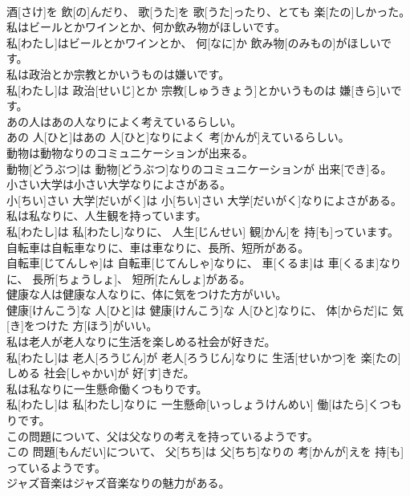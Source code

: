 \documentclass[8pt]{extreport}
\begin{document}
\begin{CJK}{UTF8}{min}
\\	酒[さけ]を 飲[の]んだり、 歌[うた]を 歌[うた]ったり、とても 楽[たの]しかった。
\\	私はビールとかワインとか、何か飲み物がほしいです。	
\\	私[わたし]はビールとかワインとか、 何[なに]か 飲み物[のみもの]がほしいです。
\\	私は政治とか宗教とかいうものは嫌いです。	
\\	私[わたし]は 政治[せいじ]とか 宗教[しゅうきょう]とかいうものは 嫌[きら]いです。
\\	あの人はあの人なりによく考えているらしい。	
\\	あの 人[ひと]はあの 人[ひと]なりによく 考[かんが]えているらしい。
\\	動物は動物なりのコミュニケーションが出来る。	
\\	動物[どうぶつ]は 動物[どうぶつ]なりのコミュニケーションが 出来[でき]る。
\\	小さい大学は小さい大学なりによさがある。	
\\	小[ちい]さい 大学[だいがく]は 小[ちい]さい 大学[だいがく]なりによさがある。
\\	私は私なりに、人生観を持っています。	
\\	私[わたし]は 私[わたし]なりに、 人生[じんせい] 観[かん]を 持[も]っています。
\\	自転車は自転車なりに、車は車なりに、長所、短所がある。	
\\	自転車[じてんしゃ]は 自転車[じてんしゃ]なりに、 車[くるま]は 車[くるま]なりに、 長所[ちょうしょ]、 短所[たんしょ]がある。
\\	健康な人は健康な人なりに、体に気をつけた方がいい。	
\\	健康[けんこう]な 人[ひと]は 健康[けんこう]な 人[ひと]なりに、 体[からだ]に 気[き]をつけた 方[ほう]がいい。
\\	私は老人が老人なりに生活を楽しめる社会が好きだ。	
\\	私[わたし]は 老人[ろうじん]が 老人[ろうじん]なりに 生活[せいかつ]を 楽[たの]しめる 社会[しゃかい]が 好[す]きだ。
\\	私は私なりに一生懸命働くつもりです。	
\\	私[わたし]は 私[わたし]なりに 一生懸命[いっしょうけんめい] 働[はたら]くつもりです。
\\	この問題について、父は父なりの考えを持っているようです。	
\\	この 問題[もんだい]について、 父[ちち]は 父[ちち]なりの 考[かんが]えを 持[も]っているようです。
\\	ジャズ音楽はジャズ音楽なりの魅力がある。	

\end{CJK}
\end{document}
